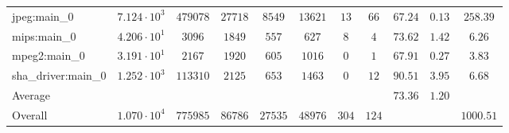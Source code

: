 \begin{tabular}{|l|c|c|c|c|c|c|c|c|c|c|}
jpeg:main\_0            & $ 7.124 \cdot 10^{3} $ & $ 479078 $ & $ 27718 $ & $ 8549  $ & $ 13621 $ & $ 13  $ & $ 66  $ & $ 67.24       $ & $ 0.13    $ & $ 258.39  $ \\
mips:main\_0            & $ 4.206 \cdot 10^{1} $ & $ 3096   $ & $ 1849  $ & $ 557   $ & $ 627   $ & $ 8   $ & $ 4   $ & $ 73.62       $ & $ 1.42    $ & $ 6.26    $ \\
mpeg2:main\_0           & $ 3.191 \cdot 10^{1} $ & $ 2167   $ & $ 1920  $ & $ 605   $ & $ 1016  $ & $ 0   $ & $ 1   $ & $ 67.91       $ & $ 0.27    $ & $ 3.83    $ \\
sha\_driver:main\_0     & $ 1.252 \cdot 10^{3} $ & $ 113310 $ & $ 2125  $ & $ 653   $ & $ 1463  $ & $ 0   $ & $ 12  $ & $ 90.51       $ & $ 3.95    $ & $ 6.68    $ \\
\hline
Average                 & $                    $ & $        $ & $       $ & $       $ & $       $ & $     $ & $     $ & $ 73.36       $ & $ 1.20    $ & $         $ \\
\hline
Overall                 & $ 1.070 \cdot 10^{4} $ & $ 775985 $ & $ 86786 $ & $ 27535 $ & $ 48976 $ & $ 304 $ & $ 124 $ & $             $ & $         $ & $ 1000.51 $ \\
\hline
\end{tabular}
